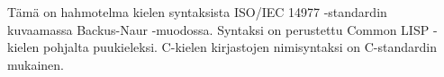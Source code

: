
Tämä on hahmotelma kielen syntaksista ISO/IEC 14977
-standardin~\citep{iso14977} kuvaamassa Backus-Naur -muodossa. Syntaksi on
perustettu Common LISP -kielen pohjalta puukieleksi. C-kielen kirjastojen
nimisyntaksi on C-standardin~\citep{C11} mukainen.

\inputminted{abnf}{lisp-base.bnf}
